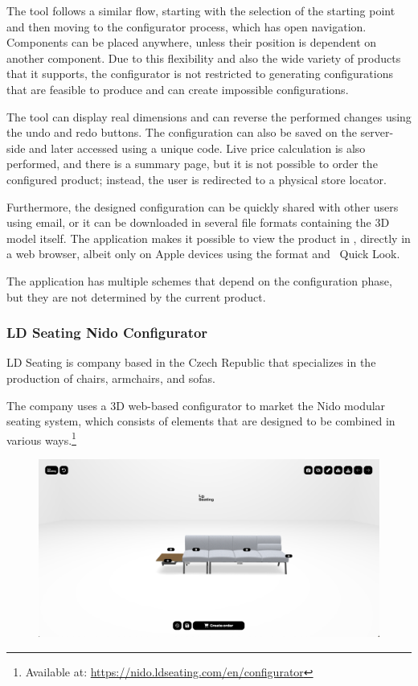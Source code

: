 The tool follows a similar flow, starting with the selection of the starting point and then moving to the configurator process, which has open navigation. Components can be placed anywhere, unless their position is dependent on another component. Due to this flexibility and also the wide variety of products that it supports, the configurator is not restricted to generating configurations that are feasible to produce and can create impossible configurations.

The tool can display real dimensions and can reverse the performed changes using the undo and redo buttons. The configuration can also be saved on the server-side and later accessed using a unique code. Live price calculation is also performed, and there is a summary page, but it is not possible to order the configured product; instead, the user is redirected to a physical store locator.

Furthermore, the designed configuration can be quickly shared with other users using email, or it can be downloaded in several file formats containing the 3D model itself. The application makes it possible to view the product in , directly in a web browser, albeit only on Apple devices using the  format and ~Quick Look.~\cite{Jackson2018}

The application has multiple  schemes that depend on the configuration phase, but they are not determined by the current product. 

\subsubsection{LD Seating Nido Configurator}

LD Seating is company based in the Czech Republic that specializes in the production of chairs, armchairs, and sofas.~\cite{LDSeating}

The company uses a 3D web-based configurator to market the Nido modular seating system, which consists of elements that are designed to be combined in various ways.\footnote{Available at: \url{https://nido.ldseating.com/en/configurator}}~\cite{NidoConfigurator}

\begin{figure}[ht]
\centering
\includegraphics[width=\textwidth]{images/analysis_nido-configurator.png}
\end{figure}

